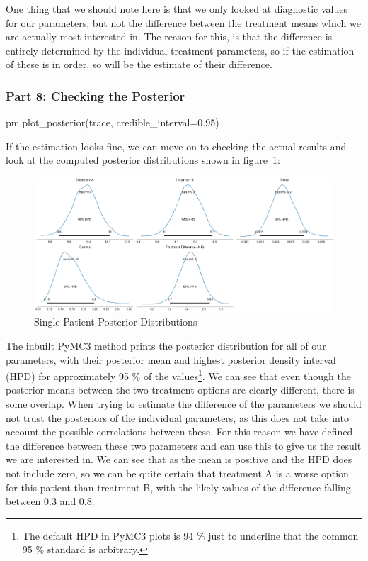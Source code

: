 \documentclass[12pt,a4paper,leqno]{report}
\theoremstyle{plain}
\theoremstyle{definition}
\theoremstyle{remark}
\begin{document}
One thing that we should note here is that we only looked at diagnostic values for our
parameters, but not the difference between the treatment means which we are actually
most interested in. The reason for this, is that the difference is entirely determined
by the individual treatment parameters, so if the estimation of these is in order, so
will be the estimate of their difference.

\subsubsection*{Part 8: Checking the Posterior}

\bigskip
\begin{pyverbatim}[][fontsize=\footnotesize]
    pm.plot_posterior(trace, credible_interval=0.95)
\end{pyverbatim}
\smallskip

If the estimation looks fine, we can move on to checking the actual results and look at
the computed posterior distributions shown in figure\ \ref{singlepatientposteriors}:

\bigskip
\begin{figure}[H]
    \caption{Single Patient Posterior Distributions}\label{singlepatientposteriors}
    \bigskip
    \includegraphics[width=\textwidth,height=\textheight,keepaspectratio]{single_patient_posteriors.pdf}
\end{figure}
\bigskip

The inbuilt PyMC3 method prints the posterior distribution for all of our parameters,
with their posterior mean and highest posterior density interval (HPD) for approximately
95 \% of the values\footnote{The default HPD in PyMC3 plots is 94 \% just to underline that the common
95 \% standard is arbitrary.}. We can see that even though the posterior means between
the two treatment options are clearly different, there is some overlap. When
trying to estimate the difference of the parameters we should not trust the posteriors of
the individual parameters, as this does not take into account the possible correlations
between these. For this reason we have defined the difference between these two
parameters and can use this to give us the result we are interested in. We can see
that as the mean is positive and the HPD does not include zero, so we can be quite certain that
treatment A is a worse option for this patient than treatment B, with the likely values of
the difference falling between 0.3 and 0.8.
\end{document}
